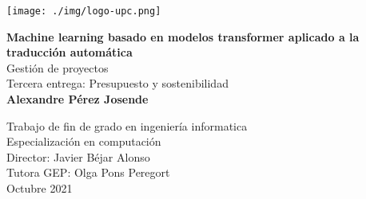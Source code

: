 \begin{titlepage}
\begin{center}

\texttt{[image: ./img/logo-upc.png]}\\[2.0cm]

\vbox{ }

{\LARGE \bfseries  Machine learning basado en modelos transformer aplicado a la traducción automática}\\[1.0cm]
{\Large Gestión de proyectos}\\[0.15cm]
{\large Tercera entrega: Presupuesto y sostenibilidad}\\[3.0cm]

{\large \bfseries Alexandre Pérez Josende}
\vfill

{\normalsize Trabajo de fin de grado en ingeniería informatica}\\
{\normalsize Especialización en computación}\\[0.4cm]

{\normalsize Director: Javier Béjar Alonso}\\
{\normalsize Tutora GEP: Olga Pons Peregort}\\[0.4cm]

{\normalsize Octubre 2021}

\end{center}
\end{titlepage}